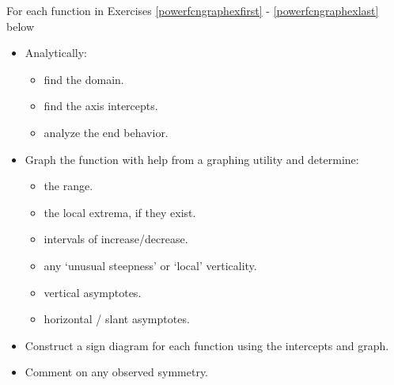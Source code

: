 For each function in Exercises \ref{powerfcngraphexfirst} - \ref{powerfcngraphexlast} below 

\begin{itemize}

\item Analytically:

\begin{multicols}{2}

\begin{itemize}

\item find the domain.

\item find the axis intercepts.

\item analyze the end behavior.

\end{itemize}

\end{multicols}

\item Graph the function with help from a graphing utility and determine:

\begin{itemize}

\item  the range.

\item the local extrema, if they exist.

\end{itemize}

\begin{itemize}

\item intervals of increase/decrease.

\item any `unusual steepness' or `local' verticality.

\end{itemize}

\begin{itemize}

\item  vertical asymptotes.

\item  horizontal / slant asymptotes.

\end{itemize}

\item Construct a sign diagram for each function using the intercepts and graph.

\item  Comment on any observed symmetry.


\end{itemize}


